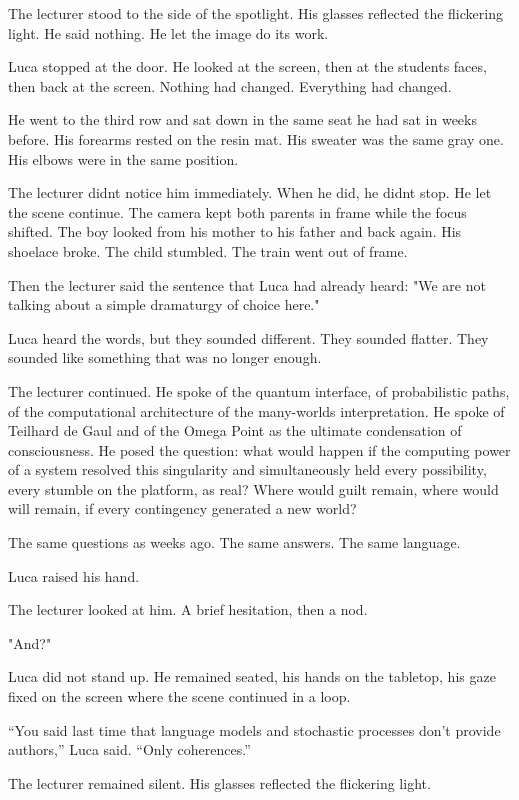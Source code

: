 \documentclass[
  ngerman,
]{article}
\begin{document}
The lecturer stood to the side of the spotlight. His glasses reflected
the flickering light. He said nothing. He let the image do its work.

Luca stopped at the door. He looked at the screen, then at the
students\textquotesingle{} faces, then back at the screen. Nothing had
changed. Everything had changed.

He went to the third row and sat down in the same seat he had sat in
weeks before. His forearms rested on the resin mat. His sweater was the
same gray one. His elbows were in the same position.

The lecturer didn\textquotesingle t notice him immediately. When he did,
he didn\textquotesingle t stop. He let the scene continue. The camera
kept both parents in frame while the focus shifted. The boy looked from
his mother to his father and back again. His shoelace broke. The child
stumbled. The train went out of frame.

Then the lecturer said the sentence that Luca had already heard: "We are
not talking about a simple dramaturgy of choice here."

Luca heard the words, but they sounded different. They sounded flatter.
They sounded like something that was no longer enough.

The lecturer continued. He spoke of the quantum interface, of
probabilistic paths, of the computational architecture of the
many-worlds interpretation. He spoke of Teilhard de Gaul and of the
Omega Point as the ultimate condensation of consciousness. He posed the
question: what would happen if the computing power of a system resolved
this singularity and simultaneously held every possibility, every
stumble on the platform, as real? Where would guilt remain, where would
will remain, if every contingency generated a new world?

The same questions as weeks ago. The same answers. The same language.

Luca raised his hand.

The lecturer looked at him. A brief hesitation, then a nod.

"And?"

Luca did not stand up. He remained seated, his hands on the tabletop,
his gaze fixed on the screen where the scene continued in a loop.

``You said last time that language models and stochastic processes don't
provide authors,'' Luca said. ``Only coherences.''

The lecturer remained silent. His glasses reflected the flickering
light.
\end{document}
